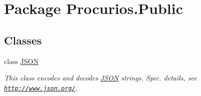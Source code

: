 \hypertarget{namespaceProcurios_1_1Public}{\section{\-Package \-Procurios.\-Public}
\label{namespaceProcurios_1_1Public}
}
\subsection*{\-Classes}
\begin{DoxyCompactItemize}
\item 
class \hyperlink{classProcurios_1_1Public_1_1JSON}{\-J\-S\-O\-N}
\begin{DoxyCompactList}\small\item\em \-This class encodes and decodes \hyperlink{classProcurios_1_1Public_1_1JSON}{\-J\-S\-O\-N} strings. \-Spec. details, see \href{http://www.json.org/}{\tt http\-://www.\-json.\-org/}. \end{DoxyCompactList}\end{DoxyCompactItemize}

